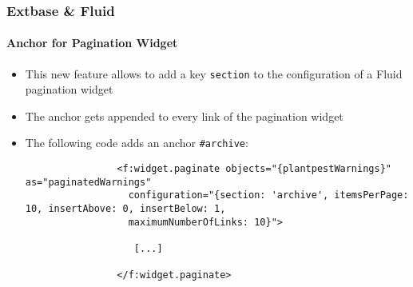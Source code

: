 \begin{frame}[fragile]
	\frametitle{Extbase \& Fluid}
	\framesubtitle{Anchor for Pagination Widget}

	\lstset{basicstyle=\tiny\ttfamily}

	\begin{itemize}

		\item This new feature allows to add a key \texttt{section} to the configuration of a
			Fluid pagination widget

		\item The anchor gets appended to every link of the pagination widget

		\item The following code adds an anchor \texttt{\#archive}:

			\begin{lstlisting}
				<f:widget.paginate objects="{plantpestWarnings}" as="paginatedWarnings"
				  configuration="{section: 'archive', itemsPerPage: 10, insertAbove: 0, insertBelow: 1,
				  maximumNumberOfLinks: 10}">

				   [...]

				</f:widget.paginate>
			\end{lstlisting}

	\end{itemize}

\end{frame}


